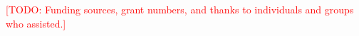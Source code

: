\documentclass[manuscript, screen, review]{jair}
\newcommand{\TODO}[1]{\textcolor{red}{[TODO: #1]}}
\begin{document}

\maketitle











\begin{acks}
\TODO{Funding sources, grant numbers, and thanks to individuals and groups who assisted.}
\end{acks}

\printbibliography

\appendix

\end{document}
